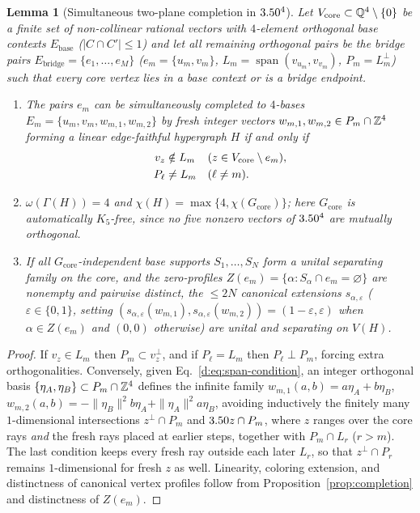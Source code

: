 \documentclass[aps,pra,reprint,superscriptaddress,longbibliography,nofootinbib,floatfix,10pt]{revtex4-2}
\newtheorem{lemma}[theorem]{Lemma}
\theoremstyle{definition}\newtheorem{definition}[theorem]{Definition}
\theoremstyle{remark}\newtheorem{remark}[theorem]{Remark}
\DeclareMathOperator{\spanop}{span}\DeclareMathOperator{\rank}{rank}
\begin{document}
\begin{lemma}[Simultaneous two-plane completion in $3.50^4$]\label{d:lem:plane-completion}
Let $V_{\mathrm{core}}\subset\mathbb Q^4\setminus\{0\}$ be a finite set of non-collinear rational vectors with $4$-element orthogonal base contexts $E_{\mathrm{base}}$ ($|C\cap C'|\le1$) and let all remaining orthogonal pairs be the bridge pairs $E_{\mathrm{bridge}}=\{e_1,\ldots,e_M\}$ ($e_m=\{u_m,v_m\}$, $L_m=\spanop(v_{u_m},v_{v_m})$, $P_m=L_m^\perp$) such that every core vertex lies in a base context or is a bridge endpoint.
\begin{enumerate}
\item The pairs $e_m$ can be simultaneously completed to $4$-bases $E_m=\{u_m,v_m,w_{m,1},w_{m,2}\}$ by fresh integer vectors $w_{m,1},w_{m,2}\in P_m\cap\mathbb Z^4$ forming a linear edge-faithful hypergraph $H$ if and only if
\begin{equation}\label{d:eq:span-condition}
\begin{aligned}
v_z&\notin L_m&& (z\in V_{\rm core}\setminus e_m),\\
P_\ell&\ne L_m&& (\ell\ne m).
\end{aligned}
\end{equation}
\item $\omega(\Gamma(H))=4$ and $\chi(H)=\max\{4,\chi(G_{\mathrm{core}})\}$; here $G_{\mathrm{core}}$ is automatically $K_5$-free, since no five nonzero vectors of $3.50^4$ are mutually orthogonal.
\item If all $G_{\mathrm{core}}$-independent base supports $S_1,\ldots,S_N$ form a unital separating family on the core, and the zero-profiles $Z(e_m)=\{\alpha:S_\alpha\cap e_m=\varnothing\}$ are nonempty and pairwise distinct, the $\le 2N$ canonical extensions $s_{\alpha,\varepsilon}$ ($\varepsilon\in\{0,1\}$, setting $(s_{\alpha,\varepsilon}(w_{m,1}),s_{\alpha,\varepsilon}(w_{m,2}))=(1-\varepsilon,\varepsilon)$ when $\alpha\in Z(e_m)$ and $(0,0)$ otherwise) are unital and separating on $V(H)$.
\end{enumerate}
\end{lemma}
\begin{proof}
If $v_z\in L_m$ then $P_m\subset v_z^\perp$, and if $P_\ell=L_m$ then $P_\ell\perp P_m$, forcing extra orthogonalities. Conversely, given Eq.~\eqref{d:eq:span-condition}, an integer orthogonal basis $\{\eta_A,\eta_B\}\subset P_m\cap\mathbb Z^4$ defines the infinite family $w_{m,1}(a,b)=a\eta_A+b\eta_B$, $w_{m,2}(a,b)=-\|\eta_B\|^2b\eta_A+\|\eta_A\|^2a\eta_B$, avoiding inductively the finitely many $1$-dimensional intersections $z^\perp\cap P_m$ and $3.50 z\cap P_m$, where $z$ ranges over the core rays \emph{and} the fresh rays placed at earlier steps, together with $P_m\cap L_r$ ($r>m$). The last condition keeps every fresh ray outside each later $L_r$, so that $z^\perp\cap P_r$ remains $1$-dimensional for fresh $z$ as well. Linearity, coloring extension, and distinctness of canonical vertex profiles follow from Proposition~\ref{prop:completion} and distinctness of $Z(e_m)$.
\end{proof}
\end{document}
